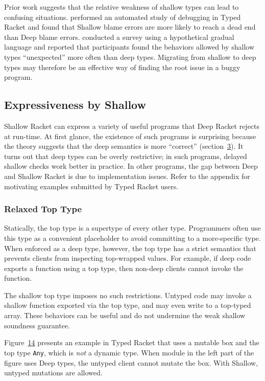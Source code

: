 \documentclass[screen=true, natbib=false, 10pt, sigplan]{acmart}
\newcommand{\ChapRef}[2]{\SecRef{#1}{#2}}
\newcommand{\SecRef}[2]{section~#1}
\newcommand{\SectionNumberLink}[2]{\hyperref[#1]{#2}}
\newcommand{\Scribtexttt}[1]{{\texttt{#1}}}
\let\SOriginalthesubsubsection\thesubsubsection
\newcommand{\Ssubsection}[2]{\subsection[#1]{#2}\let\thesubsubsection\SOriginalthesubsubsection}
\newcommand{\Ssubsubsection}[2]{\subsubsection[#1]{#2}}
\newcommand{\FigureRef}[2]{#1}
\begin{document}
Prior work suggests that the relative weakness of shallow types can lead to
confusing situations.
 performed an automated study of debugging in
Typed Racket and found that Shallow blame errors are more likely to
reach a dead end than Deep blame errors.
 conducted a survey using a hypothetical gradual language
and reported that participants found the behaviors allowed by shallow types
{``}unexpected{''} more often than deep types.
Migrating from shallow to deep types may therefore be an effective way of
finding the root issue in a buggy program.

\Ssubsection{Expressiveness by Shallow}{Expressiveness by Shallow}\label{t:x28part_x22secx3aevaluationx3aexpressivenessx22x29}

Shallow Racket can express a variety of useful programs that Deep Racket
rejects at run{-}time.
At first glance, the existence of such programs is surprising because
the theory suggests that the deep semantics is more {``}correct{''} (\ChapRef{\SectionNumberLink{t:x28part_x22secx3amodelx22x29}{3}}{Model and Metatheory}).
It turns out that deep types can be overly restrictive; in such programs,
delayed shallow checks work better in practice.
In other programs, the gap between Deep and Shallow Racket is due
to implementation issues.
Refer to the appendix for motivating examples
submitted by Typed Racket users.

\Ssubsubsection{Relaxed Top Type}{Relaxed Top Type}\label{t:x28part_x22secx3aevaluationx3aexprx3aanyx22x29}

Statically, the top type is a supertype of every other type.
Programmers often use this type as a convenient placeholder to avoid
committing to a more{-}specific type.
When enforced as a deep type, however, the top type has a strict
semantics that prevents clients from inspecting top{-}wrapped values.
For example, if deep code exports a function using a top type,
then non{-}deep clients cannot invoke the function.

The shallow top type imposes no such restrictions.
Untyped code may invoke a shallow function exported via the top type,
and may even write to a top{-}typed array.
These behaviors can be useful and do not undermine the weak shallow
soundness guarantee.

Figure~\hyperref[t:x28counter_x28x22figurex22_x22figx3aevaluationx3aanyx2dwrapx22x29x29]{\FigureRef{14}{t:x28counter_x28x22figurex22_x22figx3aevaluationx3aanyx2dwrapx22x29x29}} presents an example in Typed Racket that
uses a mutable box and the top type \Scribtexttt{Any}, which is \emph{not} a dynamic
type.
When module in the left part of the figure uses Deep types, the untyped client
cannot mutate the box.
With Shallow, untyped mutations are allowed.
\end{document}
